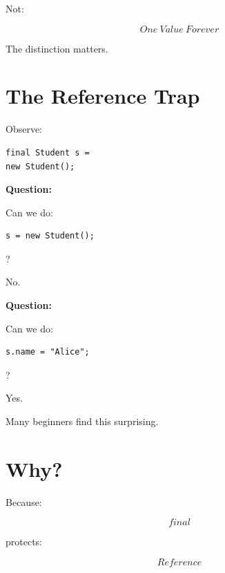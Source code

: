 \documentclass[11pt,a4paper]{book}
\begin{document}

Not:

\[
One\ Value\ Forever
\]


The distinction matters.


\section{The Reference Trap}

Observe:

\begin{verbatim}
final Student s =
new Student();
\end{verbatim}


\textbf{Question:}

Can we do:

\begin{verbatim}
s = new Student();
\end{verbatim}

?

No.


\textbf{Question:}

Can we do:

\begin{verbatim}
s.name = "Alice";
\end{verbatim}

?

Yes.


Many beginners find this surprising.


\section{Why?}

Because:

\[
final
\]

protects:

\[
Reference
\]
\end{document}
